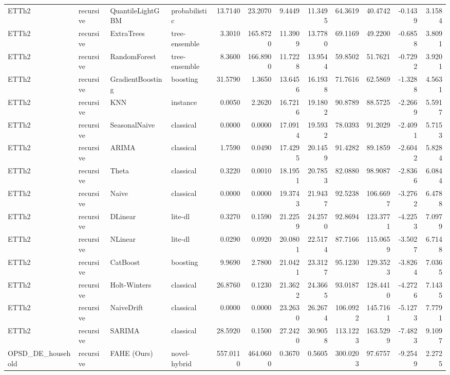 \begin{tabular}{llllrrrrrrrr}
ETTh2 & recursive & QuantileLightGBM & probabilistic & 13.7140 & 23.2070 & 9.4449 & 11.3495 & 64.3619 & 40.4742 & -0.1439 & 3.1584 \\
ETTh2 & recursive & ExtraTrees & tree-ensemble & 3.3010 & 165.8720 & 11.3909 & 13.7780 & 69.1169 & 49.2200 & -0.6858 & 3.8091 \\
ETTh2 & recursive & RandomForest & tree-ensemble & 8.3600 & 166.8900 & 11.7228 & 13.9544 & 59.8502 & 51.7621 & -0.7292 & 3.9201 \\
ETTh2 & recursive & GradientBoosting & boosting & 31.5790 & 1.3650 & 13.6456 & 16.1938 & 71.7616 & 62.5869 & -1.3288 & 4.5631 \\
ETTh2 & recursive & KNN & instance & 0.0050 & 2.2620 & 16.7216 & 19.1802 & 90.8789 & 88.5725 & -2.2669 & 5.5917 \\
ETTh2 & recursive & SeasonalNaive & classical & 0.0000 & 0.0000 & 17.0914 & 19.5932 & 78.0393 & 91.2029 & -2.4091 & 5.7153 \\
ETTh2 & recursive & ARIMA & classical & 1.7590 & 0.0490 & 17.4295 & 20.1459 & 91.4282 & 89.1859 & -2.6042 & 5.8284 \\
ETTh2 & recursive & Theta & classical & 0.3220 & 0.0010 & 18.1951 & 20.7853 & 82.0880 & 98.9087 & -2.8366 & 6.0844 \\
ETTh2 & recursive & Naive & classical & 0.0000 & 0.0000 & 19.3743 & 21.9437 & 92.5238 & 106.6697 & -3.2762 & 6.4788 \\
ETTh2 & recursive & DLinear & lite-dl & 0.3270 & 0.1590 & 21.2259 & 24.2570 & 92.8694 & 123.3771 & -4.2253 & 7.0979 \\
ETTh2 & recursive & NLinear & lite-dl & 0.0290 & 0.0920 & 20.0801 & 22.5174 & 87.7166 & 115.0659 & -3.5027 & 6.7148 \\
ETTh2 & recursive & CatBoost & boosting & 9.9690 & 2.7800 & 21.0421 & 23.3127 & 95.1230 & 129.3523 & -3.8264 & 7.0365 \\
ETTh2 & recursive & Holt-Winters & classical & 26.8760 & 0.1230 & 21.3622 & 24.3665 & 93.0187 & 128.4410 & -4.2726 & 7.1435 \\
ETTh2 & recursive & NaiveDrift & classical & 0.0000 & 0.0000 & 23.2630 & 26.2674 & 106.0922 & 145.7161 & -5.1273 & 7.7791 \\
ETTh2 & recursive & SARIMA & classical & 28.5920 & 0.1500 & 27.2420 & 30.9058 & 113.1223 & 163.5299 & -7.4823 & 9.1097 \\
OPSD_DE_household & recursive & FAHE (Ours) & novel-hybrid & 557.0110 & 464.0600 & 0.3670 & 0.5605 & 300.0203 & 97.6757 & -9.2549 & 2.2725 \\

\end{tabular}

